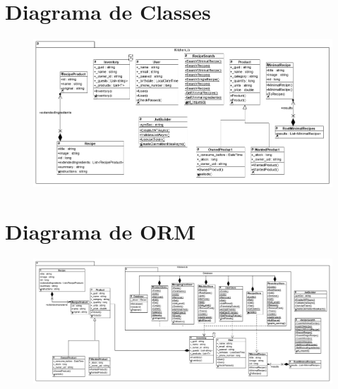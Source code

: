 \documentclass[a4paper]{report}
\begin{document}
    \section{Diagrama de Classes}
        \begin{figure}[H]
        \centering
                \includegraphics[width=\textwidth]{images/diagrama_de_classes.png}
        \end{figure}

    \section{Diagrama de ORM}
        \begin{figure}[H]
        \centering
            \includegraphics[width=\textwidth]{images/diagrama_de_ORN.png}
        \end{figure}
\end{document}
